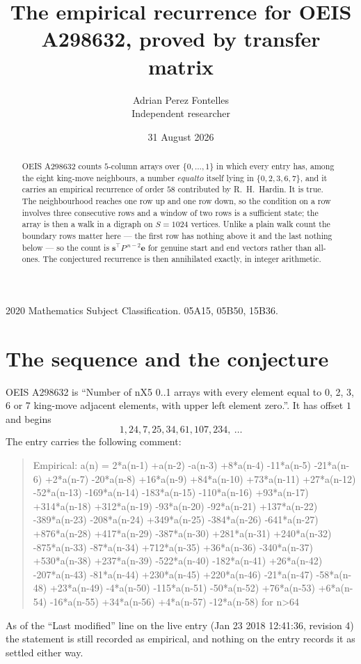 \documentclass[11pt,a4paper]{article}
\title{The empirical recurrence for OEIS A298632, proved by transfer matrix}
\author{Adrian Perez Fontelles\\ \small Independent researcher}
\date{31 August 2026}
\theoremstyle{plain}
\theoremstyle{definition}
\begin{document}
\maketitle

\begin{abstract}
OEIS A298632 counts $5$-column arrays over $\{0,\dots,1\}$ in which every entry has,
among the eight king-move neighbours, a number $equal to$ itself lying in $\{0,2,3,6,7\}$, and it carries an empirical
recurrence of order $58$ contributed by R.~H.~Hardin. It is true. The neighbourhood
reaches one row up and one row down, so the condition on a row involves three consecutive
rows and a window of two rows is a sufficient state; the array is then a walk in a digraph
on $S=1024$ vertices. Unlike a plain walk count the boundary rows matter here --- the first
row has nothing above it and the last nothing below --- so the count is
$\mathbf{s}^{\!\top}P^{\,n-2}\mathbf{e}$ for genuine start and end vectors rather than
all-ones. The conjectured recurrence is then annihilated exactly, in integer arithmetic.
\end{abstract}

\noindent\small 2020 Mathematics Subject Classification. 05A15, 05B50, 15B36.\normalsize

\section{The sequence and the conjecture}

OEIS A298632 is ``Number of nX5 0..1 arrays with every element equal to 0, 2, 3, 6 or 7 king-move adjacent elements, with upper left element zero.''. It has offset
$1$ and begins
\[
1, 24, 7, 25, 34, 61, 107, 234,\ \dots
\]
The entry carries the following comment:
\begin{quote}\small
Empirical: a(n) = 2*a(n-1) +a(n-2) -a(n-3) +8*a(n-4) -11*a(n-5) -21*a(n-6) +2*a(n-7) -20*a(n-8) +16*a(n-9) +84*a(n-10) +73*a(n-11) +27*a(n-12) -52*a(n-13) -169*a(n-14) -183*a(n-15) -110*a(n-16) +93*a(n-17) +314*a(n-18) +312*a(n-19) -93*a(n-20) -92*a(n-21) +137*a(n-22) -389*a(n-23) -208*a(n-24) +349*a(n-25) -384*a(n-26) -641*a(n-27) +876*a(n-28) +417*a(n-29) -387*a(n-30) +281*a(n-31) +240*a(n-32) -875*a(n-33) -87*a(n-34) +712*a(n-35) +36*a(n-36) -340*a(n-37) +530*a(n-38) +237*a(n-39) -522*a(n-40) -182*a(n-41) +26*a(n-42) -207*a(n-43) -81*a(n-44) +230*a(n-45) +220*a(n-46) -21*a(n-47) -58*a(n-48) +23*a(n-49) -4*a(n-50) -115*a(n-51) -50*a(n-52) +76*a(n-53) +6*a(n-54) -16*a(n-55) +34*a(n-56) +4*a(n-57) -12*a(n-58) for n>64
\end{quote}
As of the ``Last modified'' line on the live entry (Jan 23 2018 12:41:36, revision
4) the statement is still recorded as empirical, and nothing on the entry
records it as settled either way.
\end{document}
